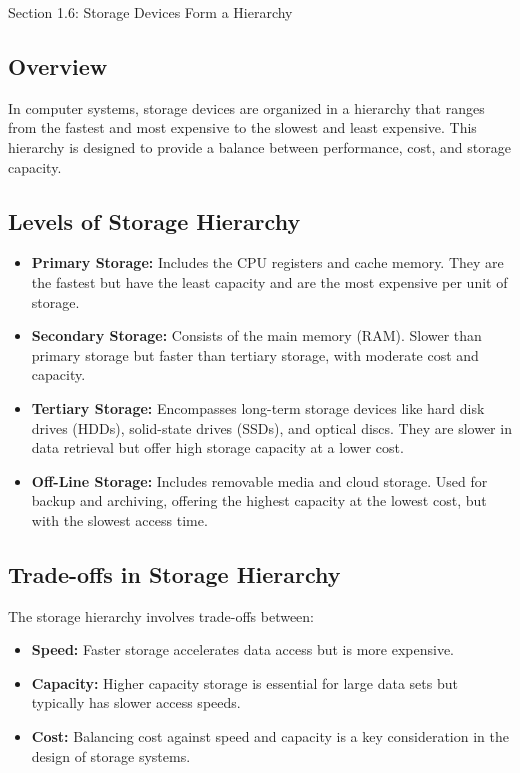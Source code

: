 \begin{notes}{Section 1.6: Storage Devices Form a Hierarchy}
    \subsection*{Overview}

    In computer systems, storage devices are organized in a hierarchy that ranges from the fastest and most expensive to the slowest and least expensive. This hierarchy is designed to provide a balance 
    between performance, cost, and storage capacity. \vspace*{1em}
    
    \subsection*{Levels of Storage Hierarchy}

    \begin{itemize}
        \item \textbf{Primary Storage:} Includes the CPU registers and cache memory. They are the fastest but have the least capacity and are the most expensive per unit of storage.
        \item \textbf{Secondary Storage:} Consists of the main memory (RAM). Slower than primary storage but faster than tertiary storage, with moderate cost and capacity.
        \item \textbf{Tertiary Storage:} Encompasses long-term storage devices like hard disk drives (HDDs), solid-state drives (SSDs), and optical discs. They are slower in data retrieval but offer 
        high storage capacity at a lower cost.
        \item \textbf{Off-Line Storage:} Includes removable media and cloud storage. Used for backup and archiving, offering the highest capacity at the lowest cost, but with the slowest access time.
    \end{itemize}
    
    \subsection*{Trade-offs in Storage Hierarchy}

    The storage hierarchy involves trade-offs between:

    \begin{itemize}
        \item \textbf{Speed:} Faster storage accelerates data access but is more expensive.
        \item \textbf{Capacity:} Higher capacity storage is essential for large data sets but typically has slower access speeds.
        \item \textbf{Cost:} Balancing cost against speed and capacity is a key consideration in the design of storage systems.
    \end{itemize}
    

\end{notes}
